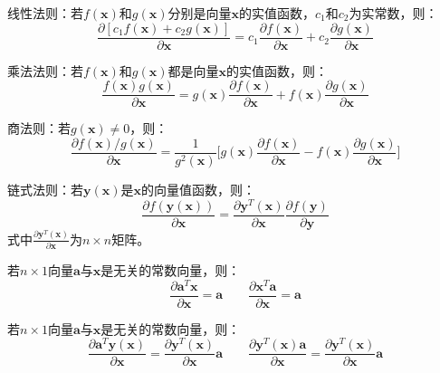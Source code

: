 \documentclass[10pt,a4paper,UTF8]{article}
\begin{document}
\begin{tikzinstance}
线性法则：若\(f(\mathbf{x})\)和\(g(\mathbf{x})\)分别是向量\(\mathbf{x}\)的实值函数，\(c_{1}\)和\(c_{2}\)为实常数，则：
\begin{equation}
\label{eq:15}
\frac{\partial[c_{1}f(\mathbf{x}) + c_{2}g(\mathbf{x})]}{\partial \mathbf{x}} = c_{1}\frac{\partial f(\mathbf{x})}{\partial \mathbf{x}} + c_{2}\frac{\partial g(\mathbf{x})}{\partial \mathbf{x}}
\end{equation}
\end{tikzinstance}
\begin{tikzinstance}
乘法法则：若\(f(\mathbf{x})\)和\(g(\mathbf{x})\)都是向量\(\mathbf{x}\)的实值函数，则：
\begin{equation}
\label{eq:16}
\frac{f(\mathbf{x})g(\mathbf{x})}{\partial \mathbf{x}} = g(\mathbf{x})\frac{\partial f(\mathbf{x})}{\partial \mathbf{x}} + f(\mathbf{x}) \frac{\partial g(\mathbf{x})}{\partial \mathbf{x}}
\end{equation}
\end{tikzinstance}
\begin{tikzinstance}
商法则：若\(g(\mathbf{x})\neq 0\)，则：
\begin{equation}
\label{eq:17}
\frac{\partial f(\mathbf{x})/g(\mathbf{x})}{\partial \mathbf{x}} = \frac{1}{g^{2}(\mathbf{x})}\bigg[ g(\mathbf{x})\frac{\partial f(\mathbf{x})}{\partial \mathbf{x}} - f(\mathbf{x}) \frac{\partial g(\mathbf{x})}{\partial \mathbf{x}} \bigg]
\end{equation}
\end{tikzinstance}
\begin{tikzinstance}
链式法则：若\(\mathbf{y}(\mathbf{x})\)是\(\mathbf{x}\)的向量值函数，则：
\begin{equation}
\label{eq:18}
\frac{\partial f(\mathbf{y}(\mathbf{x}))}{\partial \mathbf{x}} = \frac{\partial \mathbf{y}^{T}(\mathbf{x})}{\partial \mathbf{x}}\frac{\partial f(\mathbf{y})}{\partial \mathbf{y}}
\end{equation}
式中\(\frac{ \partial\mathbf{y}^{T}(\mathbf{x})}{\partial \mathbf{x}}\)为\(n\times n\)矩阵。
\end{tikzinstance}
\begin{tikzinstance}
若\(n\times 1\)向量\(\mathbf{a}\)与\(\mathbf{x}\)是无关的常数向量，则：
\begin{equation}
\label{eq:19}
\frac{\partial \mathbf{a}^{T}\mathbf{x}}{\partial \mathbf{x}} = \mathbf{a} \qquad \frac{\partial\mathbf{x}^{T}\mathbf{a}}{\partial \mathbf{x}} = \mathbf{a}
\end{equation}
\end{tikzinstance}
\begin{tikzinstance}
若\(n\times 1\)向量\(\mathbf{a}\)与\(\mathbf{x}\)是无关的常数向量，则：
\begin{equation}
\label{eq:20}
\frac{\partial\mathbf{a}^{T}\mathbf{y}(\mathbf{x})}{\partial \mathbf{x}} = \frac{\partial \mathbf{y}^{T}(\mathbf{x})}{\partial \mathbf{x}} \mathbf{a} \qquad \frac{\partial\mathbf{y}^{T}(\mathbf{x})\mathbf{a}}{\partial \mathbf{x}} =\frac{\partial\mathbf{y}^{T}(\mathbf{x})}{\partial \mathbf{x}} \mathbf{a}
\end{equation}
\end{tikzinstance}
\end{document}
